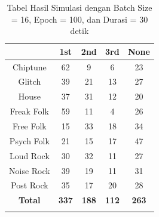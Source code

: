 \begin{longtable}[c]{|c|c|c|c|c|}
	\hline
	\textbf{}      & \textbf{1st} & \textbf{2nd} & \textbf{3rd} & \textbf{None} \\ \hline
	\endfirsthead
	\endhead
	Chiptune       & 62           & 9            & 6            & 23            \\ \hline
	Glitch         & 39           & 21           & 13           & 27            \\ \hline
	House          & 37           & 31           & 12           & 20            \\ \hline
	Freak Folk     & 59           & 11           & 4            & 26            \\ \hline
	Free Folk      & 15           & 33           & 18           & 34            \\ \hline
	Psych Folk     & 21           & 15           & 17           & 47            \\ \hline
	Loud Rock      & 30           & 32           & 11           & 27            \\ \hline
	Noise Rock     & 39           & 19           & 11           & 31            \\ \hline
	Post Rock      & 35           & 17           & 20           & 28            \\ \hline
	\textbf{Total} & \textbf{337} & \textbf{188} & \textbf{112} & \textbf{263}  \\ \hline
	\caption{Tabel Hasil Simulasi dengan Batch Size = 16, Epoch = 100, dan Durasi = 30 detik}
	\label{tab:my-table}\\
\end{longtable}

